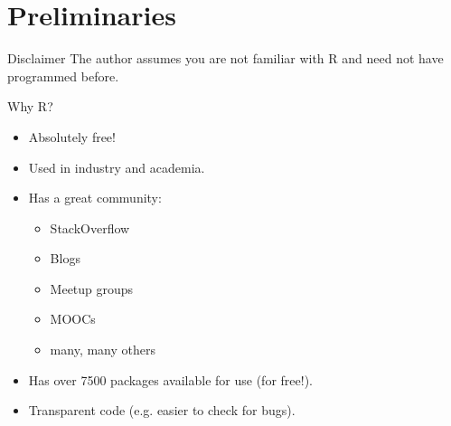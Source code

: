 \part{Preliminaries}
\normalfont
\begin{frame}
	\begin{center}
  		\begin{block}{Disclaimer} 
The author assumes you are not familiar with \ttfamily R \normalfont and need not have programmed before. \\
		\end{block}
	\end{center} 
\end{frame}

\begin{frame}
	\begin{center}
  		\begin{block}{Why R?} 
			\begin{itemize}
				\item Absolutely free!
				\item Used in industry and academia.
				\item Has a great community:
					\begin{itemize}
						\item StackOverflow
						\item Blogs
						\item Meetup groups
						\item MOOCs
						\item many, many others
					\end{itemize}
				\item Has over 7500 packages available for use (for free!).
				\item Transparent code (e.g. easier to check for bugs).
			\end{itemize}
		\end{block}
	\end{center} 
\end{frame}

